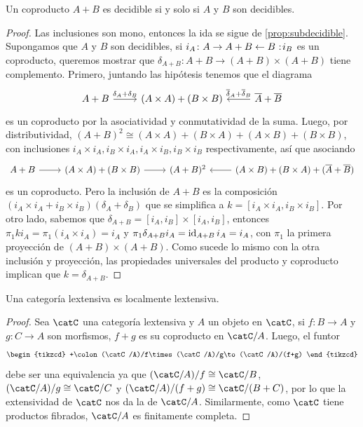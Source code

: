 \begin{proposition}
  Un coproducto $A+B$ es decidible si y solo si $A$ y $B$ son decidibles.
\end{proposition}
\begin{proof}
  Las inclusiones son mono, entonces la ida se sigue de \ref{prop:subdecidible}. Supongamos
  que $A$ y $B$ son decidibles, si $i_A\colon A\to A+B\leftarrow B\noloc i_B$ es un coproducto, 
  queremos mostrar que $\delta_{A+B}\colon A+B\to(A+B)\times(A+B)$ tiene complemento. Primero,
  juntando las hipótesis tenemos que el diagrama
  \begin{equation*}
    \begin{tikzcd}
      A+B\ar{r}{\delta_A+\delta_B} & (A\times A)+(B\times B) & \overline{A}+\overline{B}\ar[swap]{l}{\overline{\delta}_A+\overline{\delta}_B}
    \end{tikzcd}
  \end{equation*}
  es un coproducto por la asociatividad y conmutatividad de la suma. Luego, por distributividad,
  $(A+B)^2\cong(A\times A)+(B\times A)+(A\times B)+(B\times B)$, con inclusiones $i_A\times i_A,i_B\times i_A,i_A\times i_B,i_B\times i_B$ respectivamente, así que asociando
  \begin{equation*}
    \begin{tikzcd}
      A+B\ar{r}{} & (A\times A)+(B\times B)\ar{r}{} & (A+B)^2 & (A\times B)+(B\times A)+(\overline{A}+\overline{B})\ar{l}{}
    \end{tikzcd}
  \end{equation*}
  es un coproducto. Pero la inclusión de $A+B$ es la composición $(i_A\times i_A+i_B\times i_B)(\delta_A+\delta_B)$
  que se simplifica a $k=[i_A\times i_A,i_B\times i_B]$. Por otro lado, sabemos que $\delta_{A+B}=[i_A,i_B]\times[i_A,i_B]$, 
  entonces $\pi_1ki_A=\pi_1(i_A\times i_A)=i_A$ y $\pi_1\delta_{A+B}i_A=\operatorname{id}_{A+B}i_A=i_A$, con $\pi_1$ la primera
  proyección de $(A+B)\times(A+B)$. Como sucede lo mismo con la otra inclusión y proyección, las propiedades universales
  del producto y coproducto implican que $k=\delta_{A+B}$.
\end{proof}

\begin{proposition}
  Una categoría lextensiva es localmente lextensiva.
\end{proposition}
\begin{proof}
  Sea $\catC$ una categoría lextensiva y $A$ un objeto en $\catC$, si $f\colon B\to A$
  y $g\colon C\to A$ son morfismos, $f+g$ es su coproducto en $\catC/A$. Luego, el funtor
  \begin{equation*}
    \begin{tikzcd}
      +\colon(\catC/A)/f\times(\catC/A)/g\to(\catC/A)/(f+g)
    \end{tikzcd}
  \end{equation*}
  debe ser una equivalencia ya que $(\catC/A)/f\cong\catC/B$, $(\catC/A)/g\cong\catC/C$
  y $(\catC/A)/(f+g)\cong\catC/(B+C)$, por lo que la extensividad de $\catC$ nos da la de $\catC/A$.
  Similarmente, como $\catC$ tiene productos fibrados, $\catC/A$ es finitamente completa.
\end{proof}


